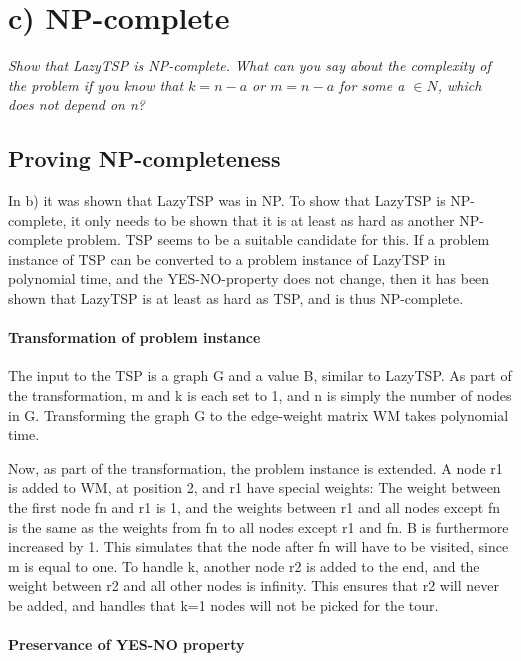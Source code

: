 
\section{c) NP-complete}

\textit{Show that LazyTSP is NP-complete. What can you say about the complexity
of the problem if you know that \(k = n - a\) or \(m = n - a\) for some a \(\in N\), which
does not depend on n?}

\subsection{Proving NP-completeness}

In b) it was shown that LazyTSP was in NP.
To show that LazyTSP is NP-complete, it only needs to be shown that
it is at least as hard as another NP-complete problem. TSP seems to be a suitable
candidate for this. If a problem instance of TSP can be converted to
a problem instance of LazyTSP in polynomial time, and the YES-NO-property
does not change, then it has been shown that LazyTSP is at least as hard
as TSP, and is thus NP-complete.

\paragraph{Transformation of problem instance}

The input to the TSP is a graph G and a value B, similar to LazyTSP.
As part of the transformation, m and k is each set to 1, and n is simply
the number of nodes in G. Transforming the graph G to the edge-weight matrix WM
takes polynomial time.

Now, as part of the transformation, the problem instance is extended.
A node r1 is added to WM, at position 2, and r1 have special weights:
The weight between the first node fn and r1 is 1, and the weights between r1 and all nodes
except fn is the same as the weights from fn to all nodes except r1 and fn.
B is furthermore increased by 1. This simulates that the node after fn will
have to be visited, since m is equal to one.
To handle k, another node r2 is added to the end, and the weight between r2 and all other
nodes is infinity. This ensures that r2 will never be added, and handles that
k=1 nodes will not be picked for the tour.

\paragraph{Preservance of YES-NO property}


